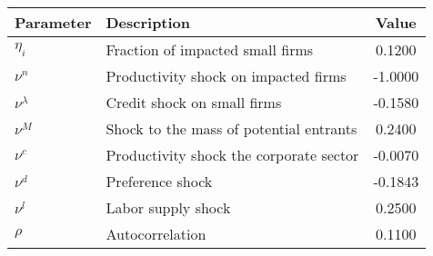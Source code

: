  \begin{tabular}{llc} \hline 
 Parameter & Description & Value \\ 
 \hline 
$ \eta_{i}$ & Fraction of impacted small firms &   0.1200 \\ 
$ \nu^{n}$ & Productivity shock on impacted firms &  -1.0000 \\ 
$ \nu^{\lambda}$ & Credit shock on small firms &  -0.1580 \\ 
$ \nu^{M}$ & Shock to the mass of potential entrants &   0.2400 \\ 
$ \nu^{c}$ & Productivity shock the corporate sector &  -0.0070 \\ 
$ \nu^{d}$ & Preference shock                  &  -0.1843 \\ 
$ \nu^{l}$ & Labor supply shock                &   0.2500 \\ 
$ \rho   $ & Autocorrelation                   &   0.1100 \\ 
\hline 
 \end{tabular} 
